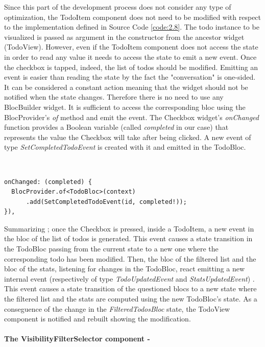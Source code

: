 Since this part of the development process does not consider any type of optimization, the TodoItem component does not need to be modified with respect to the implementation defined in Source Code \ref{code:2.8}. The todo instance to be visualized is passed as argument in the constructor from the ancestor widget (TodoView). However, even if the TodoItem component does not access the state in order to read any value it needs to access the state to emit a new event. Once the checkbox is tapped, indeed, the list of todos should be modified. Emitting an event is easier than reading the state by the fact the "conversation" is one-sided. It can be considered a constant action meaning that the widget should not be notified when the state changes. Therefore there is no need to use any BlocBuilder widget. It is sufficient to access the corresponding bloc using the BlocProvider’s \textit{of} method and emit the event. The Checkbox widget’s \textit{onChanged} function provides a Boolean variable (called \textit{completed} in our case) that represents the value the Checkbox will take after being clicked.  A new event of type \textit{SetCompletedTodoEvent} is created with it and emitted in the TodoBloc.
\begin{code}
\mbox{}\\
 \mbox{}
\label{code:2.14}
\begin{verbatim}
onChanged: (completed) {
  BlocProvider.of<TodoBloc>(context)
      .add(SetCompletedTodoEvent(id, completed!));
}),
\end{verbatim}
\mbox{}
\end{code}

Summarizing ;  once the Checkbox is pressed, inside a TodoItem,  a new event in the bloc of the list of todos is generated. This event causes a state transition in the TodoBloc passing from the current state to a new one where the corresponding todo has been modified. Then, the bloc of the filtered list and the bloc of the stats, listening for changes in the TodoBloc, react emitting a new internal event (respectively of type \textit{TodoUpdatedEvent} and \textit{StatsUpdatedEvent}) . This event causes a state transition of the questioned blocs to a new state where the filtered list and the stats are computed using the new TodoBloc’s state. As a conseguence of the change in the \textit{FilteredTodosBloc} state,  the TodoView component is notified and rebuilt showing the modification.
\paragraph{The VisibilityFilterSelector component - }
\label{subpar:todo_app_bloc_core_state}

